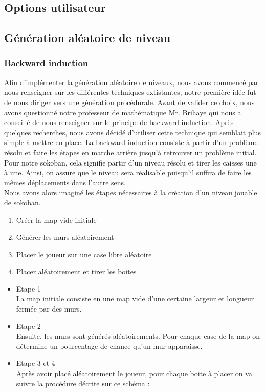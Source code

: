 \documentclass[../main.tex]{subfiles}
\begin{document}
\subsection{Options utilisateur}

\subsection{Génération aléatoire de niveau}

\subsubsection{Backward induction}
Afin d'implémenter la génération aléatoire de niveaux, nous avons commencé par nous renseigner sur les différentes techniques extistantes, notre première idée fut de nous diriger vers une génération procédurale.
Avant de valider ce choix, nous avons questionné notre professeur de mathématique Mr. Brihaye qui nous a conseillé de nous renseigner sur le principe de backward induction.
Après quelques recherches, nous avons décidé d'utiliser cette technique qui semblait plus simple à mettre en place.
La backward induction consiste à partir d'un problème résolu et faire les étapes en marche arrière jusqu'à retrouver un problème initial.
Pour notre sokoban, cela signifie partir d'un niveau résolu et tirer les caisses une à une.
Ainsi, on assure que le niveau sera réalisable puisqu'il suffira de faire les mêmes déplacements dans l'autre sens.\\
Nous avons alors imaginé les étapes nécessaires à la création d'un niveau jouable de sokoban.
\begin{enumerate}
	\item Créer la map vide initiale 
	\item Générer les murs aléatoirement
	\item Placer le joueur sur une case libre aléatoire
	\item Placer aléatoirement et tirer les boites
\end{enumerate}
\begin{itemize}
	\item Etape 1\\
		  La map initiale consiste en une map vide d'une certaine largeur et longueur fermée par des murs.
	\item Etape 2\\
		  Ensuite, les murs sont générés aléatoirements. Pour chaque case de la map on détermine un pourcentage de chance qu'un mur apparaisse.
	\item Etape 3 et 4\\
		  Après avoir placé aléatoirement le joueur, pour chaque boite à placer on va suivre la procédure décrite sur ce schéma :\\
\end{itemize}
\end{document}
